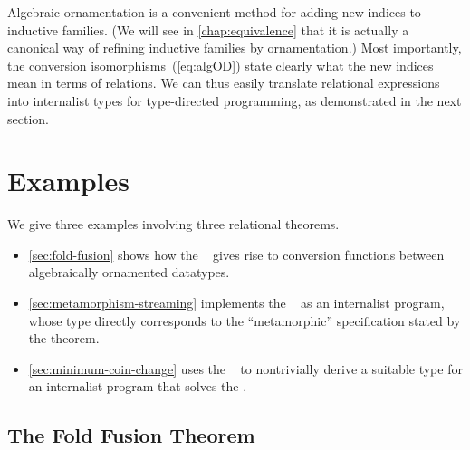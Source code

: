 Algebraic ornamentation is a convenient method for adding new indices to inductive families.
(We will see in \autoref{chap:equivalence} that it is actually a canonical way of refining inductive families by ornamentation.)
Most importantly, the conversion isomorphisms~(\ref{eq:algOD}) state clearly what the new indices mean in terms of relations.
We can thus easily translate relational expressions into internalist types for type-directed programming, as demonstrated in the next section.

\section{Examples}
\label{sec:internalism-examples}

We give three examples involving three relational theorems.
\begin{itemize}
\item \autoref{sec:fold-fusion} shows how the ~\citep[Section~6.2]{Bird-AoP} gives rise to conversion functions between algebraically ornamented datatypes.
\item \autoref{sec:metamorphism-streaming} implements the ~\citep[Theorem~30]{Bird-arithmetic-coding} as an internalist program, whose type directly corresponds to the ``metamorphic'' specification stated by the theorem.
\item \autoref{sec:minimum-coin-change} uses the ~\citep[Theorem~10.1]{Bird-AoP} to nontrivially derive a suitable type for an internalist program that solves the .
\end{itemize}

\subsection{The Fold Fusion Theorem}
\label{sec:fold-fusion}

